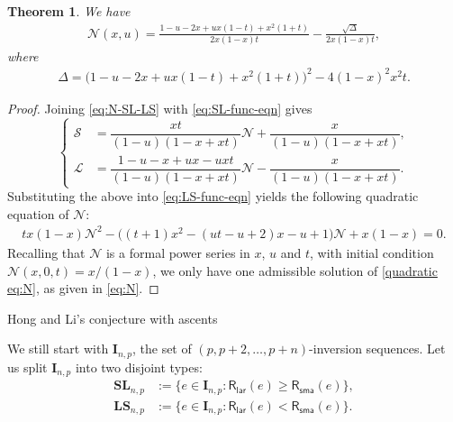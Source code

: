 \documentclass[reqno]{amsart}
\makeatletter
\numberwithin{equation}{section}
\theoremstyle{plain}
\newtheorem{theorem}{Theorem}[section]
\theoremstyle{definition}
\theoremstyle{named}
\def\section{\@startsection{section}{1}
  \z@{.7\linespacing\@plus\linespacing}{.5\linespacing}

  {\normalfont\scshape}}
\newcommand{\bI}{\mathbf{I}}
\newcommand{\bSL}{\mathbf{SL}}
\newcommand{\bLS}{\mathbf{LS}}
\newcommand{\RLAR}{\mathsf{R}_{\mathsf{lar}}}
\newcommand{\RSMA}{\mathsf{R}_{\mathsf{sma}}}
\newcommand{\cN}{\mathcal{N}}
\newcommand{\cSL}{\mathcal{S}}
\newcommand{\cLS}{\mathcal{L}}
\makeatother
\begin{document}
\begin{theorem}
	We have
	\begin{align}\label{eq:N}
		\cN(x,u)=\frac{1-u-2x+ux(1-t)+x^2(1+t)}{2x(1-x)t}-\frac{\sqrt{\Delta}}{2x(1-x)t},
	\end{align}
	where
	\begin{align}
		\Delta=\big(1-u-2x+ux(1-t)+x^2(1+t)\big)^2-4(1-x)^2 x^2 t.
	\end{align}
\end{theorem}

\begin{proof}
	Joining \eqref{eq:N-SL-LS} with \eqref{eq:SL-func-eqn} gives
	\begin{equation*}
		\left\{
		\begin{aligned}
			\cSL&=\dfrac{xt}{(1-u)(1-x+xt)} \cN+\dfrac{x}{(1-u)(1-x+xt)},\\[12pt]
			\cLS&=\dfrac{1-u-x+ux-uxt}{(1-u)(1-x+xt)}\cN-\dfrac{x}{(1-u)(1-x+xt)}.
		\end{aligned}
		\right.
	\end{equation*}
	Substituting the above into \eqref{eq:LS-func-eqn} yields the following quadratic equation of $\cN$:
	\begin{align}\label{quadratic eq:N}
	tx(1-x)\cN^2-\big((t+1)x^2-(ut-u+2)x-u+1\big)\cN+x(1-x)=0.
	\end{align}
	Recalling that $\cN$ is a formal power series in $x$, $u$ and $t$, with initial condition $\cN(x,0,t)=x/(1-x)$, we only have one admissible solution of \eqref{quadratic eq:N}, as given in \eqref{eq:N}.
\end{proof}

\section{Hong and Li's conjecture with ascents}

We still start with $\bI_{n,p}$, the set of $(p,p+2,\ldots,p+n)$-inversion sequences. Let us split $\bI_{n,p}$ into two disjoint types:
\begin{align*}
	\bSL_{n,p}&:=\{e\in\bI_{n,p}:\RLAR(e)\ge \RSMA(e)\},\\
	\bLS_{n,p}&:=\{e\in\bI_{n,p}:\RLAR(e)< \RSMA(e)\}.
\end{align*}
\end{document}
